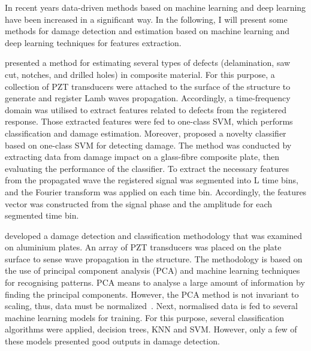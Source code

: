 In recent years data-driven methods based on machine learning and deep learning have been increased in a significant way. 
In the following, I will present some methods for damage detection and estimation based on machine learning and deep learning techniques for features extraction. 

\textcite{Das2010} presented a method for estimating several types of defects (delamination, saw cut, notches, and drilled holes) in composite material. 
For this purpose, a collection of PZT transducers were attached to the surface of the structure to generate and register Lamb waves propagation. 
Accordingly, a time-frequency domain was utilised to extract features related to defects from the registered response. 
Those extracted features were fed to one-class SVM, which performs classification and damage estimation. 
Moreover, \textcite{Dib2018} proposed a novelty classifier based on one-class SVM for detecting damage. 
The method was conducted by extracting data from damage impact on a glass-fibre composite plate, then evaluating the performance of the classifier. 
To extract the necessary features from the propagated wave the registered signal was segmented into L time bins, and the Fourier transform was applied on each time bin.
Accordingly, the features vector was constructed from the signal phase and the amplitude for each segmented time bin.

\textcite{Vitola2016} developed a damage detection and classification methodology that was examined on aluminium plates.
An array of PZT transducers was placed on the plate surface to sense wave propagation in the structure.
The methodology is based on the use of principal component analysis (PCA) and machine learning techniques for recognising patterns. 
PCA means to analyse a large amount of information by finding the principal components.
However, the PCA method is not invariant to scaling, thus, data must be normalized~\cite{Tibaduiza2016}. 
Next, normalised data is fed to several machine learning models for training. 
For this purpose, several classification algorithms were applied, decision trees, KNN and SVM. 
However, only a few of these models presented good outputs in damage detection. 


